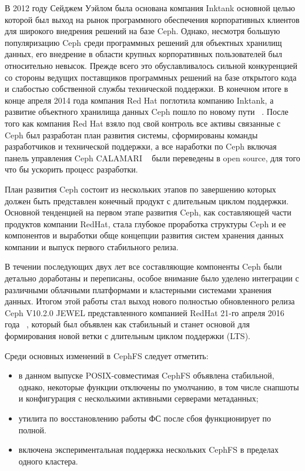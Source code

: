 \documentclass[10pt, a5paper]{article}
\begin{document}
В 2012 году  Сейджем Уэйлом была основана компания  Inktank основной целью которой был выход на рынок программного обеспечения корпоративных клиентов для широкого внедрения решений на базе Ceph. Однако, несмотря  большую популяризацию  Ceph среди программных решений для объектных хранилищ данных, его внедрение в области крупных корпоративных пользователей был относительно невысок. Прежде всего это обуславливалось сильной конкуренцией со стороны ведущих поставщиков программных решений на базе открытого кода и слабостью собственной службы технической поддержки. В конечном итоге в конце апреля 2014 года компания Red Hat поглотила компанию Inktank, а развитие объектного хранилища данных Ceph пошло по новому пути ~\cite{Kliga3}. 
После того как компания Red Hat взяло под свой контроль все активы связанные с Ceph был разработан план развития системы, сформированы команды разработчиков и технической поддержки, а все наработки по Ceph включая  панель управления Ceph CALAMARI ~\cite{Kliga4} были переведены в open source, для того что бы ускорить процесс разработки.

План развития Ceph состоит из нескольких этапов по завершению которых должен быть представлен конечный продукт с длительным циклом поддержки. Основной тенденцией на первом этапе развития Ceph, как составляющей части продуктов компании RedHat, стала глубокое проработка структуры Ceph и ее компонентов и выработки обще концепции развития систем хранения данных компании и выпуск первого стабильного релиза.

В течении последующих двух лет  все составляющие компоненты Ceph были детально доработаны и переписаны, особое внимание было уделено интеграции с различными облачными платформами и кластерными системами хранения данных.  Итогом этой работы  стал выход нового полностью обновленного релиза Ceph V10.2.0 JEWEL представленного компанией RedHat 21-го апреля 2016 года ~\cite{Kliga5}, который был объявлен как стабильный и станет основой для  формирования новой ветки с длительным циклом поддержки (LTS).

Среди основных изменений в CephFS следует отметить:

\begin{itemize}
  \item в данном выпуске POSIX-совместимая CephFS объявлена стабильной, однако, некоторые функции отключены по умолчанию, в том числе снапшоты и конфигурация с несколькими активными серверами метаданных;
  \item утилита по восстановлению работы ФС после сбоя функционирует по полной.
  \item включена экспериментальная поддержка нескольких CephFS в пределах одного кластера.
\end{itemize}
\end{document}
